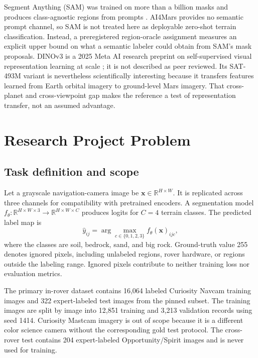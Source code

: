 \documentclass[11pt]{article}
\newcommand{\R}{\ensuremath{\mathbb{R}}}
\begin{document}
Segment Anything (SAM) was trained on more than a billion masks and produces class-agnostic regions
from prompts \cite{kirillov2023sam}. AI4Mars provides no semantic prompt channel, so SAM is not
treated here as deployable zero-shot terrain classification. Instead, a preregistered region-oracle
assignment measures an explicit upper bound on what a semantic labeler could obtain from SAM's mask
proposals. DINOv3 is a 2025 Meta AI research preprint on self-supervised visual representation
learning at scale \cite{simeoni2025dinov3}; it is not described as peer reviewed. Its SAT-493M
variant is nevertheless scientifically interesting because it transfers features learned from
Earth orbital imagery to ground-level Mars imagery. That cross-planet and cross-viewpoint gap makes
the reference a test of representation transfer, not an assumed advantage.

\section{Research Project Problem}

\subsection{Task definition and scope}

Let a grayscale navigation-camera image be
$\mathbf{x}\in\R^{H\times W}$. It is replicated across three channels for compatibility with
pretrained encoders. A segmentation model
$f_{\theta}:\R^{H\times W\times 3}\rightarrow\R^{H\times W\times C}$ produces logits for
$C=4$ terrain classes. The predicted label map is
\begin{equation}
\hat{y}_{ij}=\arg\max_{c\in\{0,1,2,3\}} f_{\theta}(\mathbf{x})_{ijc},
\end{equation}
where the classes are soil, bedrock, sand, and big rock. Ground-truth value 255 denotes ignored
pixels, including unlabeled regions, rover hardware, or regions outside the labeling range. Ignored
pixels contribute to neither training loss nor evaluation metrics.

The primary in-rover dataset contains 16,064 labeled Curiosity Navcam training images and 322
expert-labeled test images from the pinned
 subset. The training images are split by image into 12,851 training
and 3,213 validation records using seed 1414. Curiosity Mastcam imagery is out of scope because it
is a different color science camera without the corresponding gold test protocol. The cross-rover
test contains 204 expert-labeled Opportunity/Spirit images and is never used for training.
\end{document}

